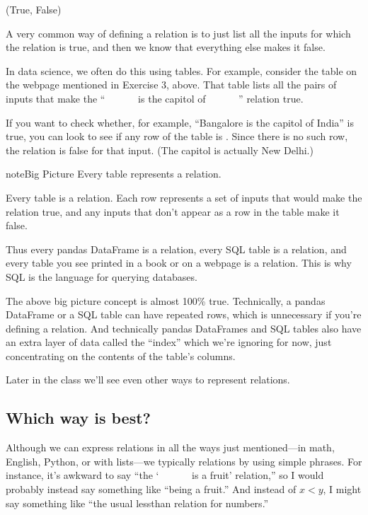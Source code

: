 \documentclass[letterpaper,10pt,english]{jupyterBook}
\begin{document}
\begin{sphinxVerbatim}[commandchars=\\\{\}]
(True, False)
\end{sphinxVerbatim}

\sphinxAtStartPar
{} A very common way of defining a relation is to just list all the inputs for which the relation is true, and then we know that everything else makes it false.

\sphinxAtStartPar
In data science, we often do this using tables.  For example, consider the table on the webpage mentioned in Exercise 3, above.  That table lists all the pairs of inputs that make the “        is the capitol of        ” relation true.

\sphinxAtStartPar
If you want to check whether, for example, “Bangalore is the capitol of India” is true, you can look to see if any row of the table is .  Since there is no such row, the relation is false for that input.  (The capitol is actually New Delhi.)

\begin{sphinxadmonition}{note}{Big Picture \sphinxhyphen{} Every table represents a relation.}

\sphinxAtStartPar
Every table is a relation.  Each row represents a set of inputs that would make the relation true, and any inputs that don’t appear as a row in the table make it false.

\sphinxAtStartPar
Thus every pandas DataFrame is a relation, every SQL table is a relation, and every table you see printed in a book or on a webpage is a relation.  This is why SQL is the language for querying  databases.
\end{sphinxadmonition}

\sphinxAtStartPar
The above big picture concept is almost 100\% true.  Technically, a pandas DataFrame or a SQL table can have repeated rows, which is unnecessary if you’re defining a relation.  And technically pandas DataFrames and SQL tables also have an extra layer of data called the “index” which we’re ignoring for now, just concentrating on the contents of the table’s columns.

\sphinxAtStartPar
{} Later in the class we’ll see even other ways to represent relations.


\subsection{Which way is best?}
\label{\detokenize{chapter-2-mathematical-foundations:id1}}
\sphinxAtStartPar
Although we can express relations in all the ways just mentioned—in math, English, Python, or with lists—we typically  relations by using simple phrases.  For instance, it’s awkward to say “the ‘        is a fruit’ relation,” so I would probably instead say something like “being a fruit.”  And instead of \(x<y\), I might say something like “the usual less\sphinxhyphen{}than relation for numbers.”
\end{document}
